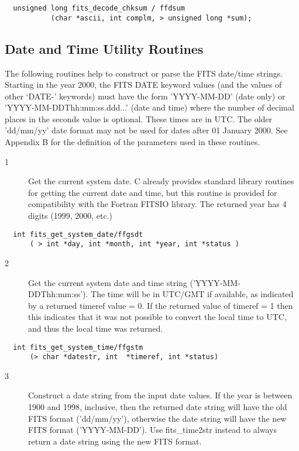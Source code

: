 \documentclass[11pt]{book}
\begin{document}
\begin{verbatim}
  unsigned long fits_decode_chksum / ffdsum
           (char *ascii, int complm, > unsigned long *sum);
\end{verbatim}


\subsection{Date and Time Utility Routines}

The following routines help to construct or parse the FITS date/time
strings.   Starting in the year 2000, the FITS DATE keyword values (and
the values of other `DATE-' keywords) must have the form 'YYYY-MM-DD'
(date only) or 'YYYY-MM-DDThh:mm:ss.ddd...' (date and time) where the
number of decimal places in the seconds value is optional.  These times
are in UTC.  The older 'dd/mm/yy' date format may not be used for dates
after 01 January 2000.  See Appendix B for the definition of the
parameters used in these routines.


\begin{description}
\item[1 ] Get the current system date.  C already provides standard
    library routines for getting the current date and time,
    but this routine is provided for compatibility with
    the Fortran FITSIO library.  The returned year has 4 digits
    (1999, 2000, etc.) \label{ffgsdt}
\end{description}

\begin{verbatim}
  int fits_get_system_date/ffgsdt
      ( > int *day, int *month, int *year, int *status )
\end{verbatim}


\begin{description}
\item[2 ] Get the current system date and time string ('YYYY-MM-DDThh:mm:ss').
The time will be in UTC/GMT if available, as indicated by a returned timeref
value = 0.  If the returned value of timeref = 1 then this indicates that
it was not possible to convert the local time to UTC, and thus the local
time was returned.
\end{description}

\begin{verbatim}
  int fits_get_system_time/ffgstm
      (> char *datestr, int  *timeref, int *status)
\end{verbatim}


\begin{description}
\item[3 ] Construct a date string from the input date values.  If the year
is between 1900 and 1998, inclusive, then the returned date string will
have the old FITS format ('dd/mm/yy'), otherwise the date string will
have the new FITS format ('YYYY-MM-DD').  Use fits\_time2str instead
 to always return a date string using the new FITS format. \label{ffdt2s}
\end{description}
\end{document}
